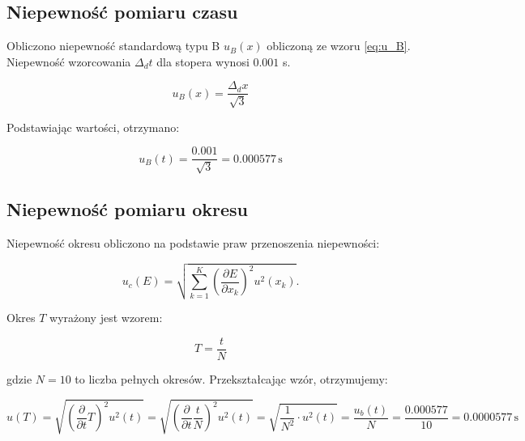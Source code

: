 \documentclass[a4paper,12pt]{article}
\begin{document}
\subsection*{Niepewność pomiaru czasu}

Obliczono niepewność standardową typu B  $u_B(x)$  obliczoną ze wzoru \ref{eq:u_B}. Niepewność wzorcowania $\Delta_d t$ dla stopera wynosi $0.001$ s.


\begin{equation}
    \label{eq:u_B}
    u_B(x) = \frac{\Delta_d x}{\sqrt{3}}
\end{equation}



Podstawiając wartości, otrzymano:



$$
    u_B(t) = \frac{0.001}{\sqrt{3}} = 0.000577\,\text{s}
$$


\subsection*{Niepewność pomiaru okresu}

Niepewność okresu obliczono na podstawie praw przenoszenia niepewności:

\begin{equation}
    \label{eq:niepewnosc_zlozona}
    u_c(E) = \sqrt{\sum_{k=1}^{K} \left( \frac{\partial E}{\partial x_k} \right)^2 u^2(x_k)}.
\end{equation}

Okres $T$ wyrażony jest wzorem:

\[
    T = \frac{t}{N}
\]

gdzie $N=10$ to liczba pełnych okresów. Przekształcając wzór, otrzymujemy:

\[
    u(T) = \sqrt{\left(\frac{\partial}{\partial t} T\right)^2 u^2(t)} = \sqrt{\left(\frac{\partial}{\partial t} \frac{t}{N}\right)^2 u^2(t)} = \sqrt{ \frac{1}{N^2} \cdot u^2(t)} = \frac{u_b(t)}{N} = \frac{0.000577}{10} = 0.0000577\,\text{s}
\]






\end{document}
